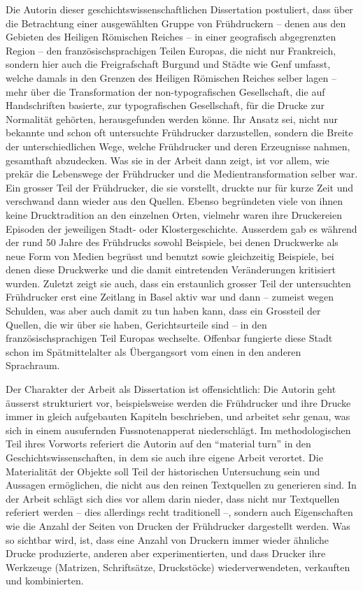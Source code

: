 \documentclass[a4paper,
fontsize=11pt,
oneside,
numbers=noperiodatend,
parskip=half-,
bibliography=totoc,
final
]{scrartcl}
\begin{document}
Die Autorin dieser geschichtswissenschaftlichen Dissertation postuliert,
dass über die Betrachtung einer ausgewählten Gruppe von Frühdruckern --
denen aus den Gebieten des Heiligen Römischen Reiches -- in einer
geografisch abgegrenzten Region -- den französischsprachigen Teilen
Europas, die nicht nur Frankreich, sondern hier auch die Freigrafschaft
Burgund und Städte wie Genf umfasst, welche damals in den Grenzen des
Heiligen Römischen Reiches selber lagen -- mehr über die Transformation
der non-typografischen Gesellschaft, die auf Handschriften basierte, zur
typografischen Gesellschaft, für die Drucke zur Normalität gehörten,
herausgefunden werden könne. Ihr Ansatz sei, nicht nur bekannte und
schon oft untersuchte Frühdrucker darzustellen, sondern die Breite der
unterschiedlichen Wege, welche Frühdrucker und deren Erzeugnisse nahmen,
gesamthaft abzudecken. Was sie in der Arbeit dann zeigt, ist vor allem,
wie prekär die Lebenswege der Frühdrucker und die Medientransformation
selber war. Ein grosser Teil der Frühdrucker, die sie vorstellt, druckte
nur für kurze Zeit und verschwand dann wieder aus den Quellen. Ebenso
begründeten viele von ihnen keine Drucktradition an den einzelnen Orten,
vielmehr waren ihre Druckereien Episoden der jeweiligen Stadt- oder
Klostergeschichte. Ausserdem gab es während der rund 50 Jahre des
Frühdrucks sowohl Beispiele, bei denen Druckwerke als neue Form von
Medien begrüsst und benutzt sowie gleichzeitig Beispiele, bei denen
diese Druckwerke und die damit eintretenden Veränderungen kritisiert
wurden. Zuletzt zeigt sie auch, dass ein erstaunlich grosser Teil der
untersuchten Frühdrucker erst eine Zeitlang in Basel aktiv war und dann
-- zumeist wegen Schulden, was aber auch damit zu tun haben kann, dass
ein Grossteil der Quellen, die wir über sie haben, Gerichtsurteile sind
-- in den französischsprachigen Teil Europas wechselte. Offenbar
fungierte diese Stadt schon im Spätmittelalter als Übergangsort vom
einen in den anderen Sprachraum.

Der Charakter der Arbeit als Dissertation ist offensichtlich: Die
Autorin geht äusserst strukturiert vor, beispielsweise werden die
Frühdrucker und ihre Drucke immer in gleich aufgebauten Kapiteln
beschrieben, und arbeitet sehr genau, was sich in einem ausufernden
Fussnotenapperat niederschlägt. Im methodologischen Teil ihres Vorworts
referiert die Autorin auf den \enquote{material turn} in den
Geschichtswissenschaften, in dem sie auch ihre eigene Arbeit verortet.
Die Materialität der Objekte soll Teil der historischen Untersuchung
sein und Aussagen ermöglichen, die nicht aus den reinen Textquellen zu
generieren sind. In der Arbeit schlägt sich dies vor allem darin nieder,
dass nicht nur Textquellen referiert werden -- dies allerdings recht
traditionell --, sondern auch Eigenschaften wie die Anzahl der Seiten
von Drucken der Frühdrucker dargestellt werden. Was so sichtbar wird,
ist, dass eine Anzahl von Druckern immer wieder ähnliche Drucke
produzierte, anderen aber experimentierten, und dass Drucker ihre
Werkzeuge (Matrizen, Schriftsätze, Druckstöcke) wiederverwendeten,
verkauften und kombinierten.
\end{document}

